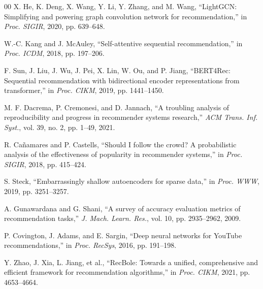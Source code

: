 \documentclass[journal]{IEEEtran}
\begin{document}
\begin{thebibliography}{00}
X. He, K. Deng, X. Wang, Y. Li, Y. Zhang, and M. Wang, ``LightGCN: Simplifying and powering graph convolution network for recommendation,'' in \textit{Proc. SIGIR}, 2020, pp. 639--648.

W.-C. Kang and J. McAuley, ``Self-attentive sequential recommendation,'' in \textit{Proc. ICDM}, 2018, pp. 197--206.

F. Sun, J. Liu, J. Wu, J. Pei, X. Lin, W. Ou, and P. Jiang, ``BERT4Rec: Sequential recommendation with bidirectional encoder representations from transformer,'' in \textit{Proc. CIKM}, 2019, pp. 1441--1450.

M. F. Dacrema, P. Cremonesi, and D. Jannach, ``A troubling analysis of reproducibility and progress in recommender systems research,'' \textit{ACM Trans. Inf. Syst.}, vol. 39, no. 2, pp. 1--49, 2021.

R. Ca{\~n}amares and P. Castells, ``Should I follow the crowd? A probabilistic analysis of the effectiveness of popularity in recommender systems,'' in \textit{Proc. SIGIR}, 2018, pp. 415--424.

S. Steck, ``Embarrassingly shallow autoencoders for sparse data,'' in \textit{Proc. WWW}, 2019, pp. 3251--3257.

A. Gunawardana and G. Shani, ``A survey of accuracy evaluation metrics of recommendation tasks,'' \textit{J. Mach. Learn. Res.}, vol. 10, pp. 2935--2962, 2009.

P. Covington, J. Adams, and E. Sargin, ``Deep neural networks for YouTube recommendations,'' in \textit{Proc. RecSys}, 2016, pp. 191--198.

Y. Zhao, J. Xia, L. Jiang, et al., ``RecBole: Towards a unified, comprehensive and efficient framework for recommendation algorithms,'' in \textit{Proc. CIKM}, 2021, pp. 4653--4664.

\end{thebibliography}
\end{document}
